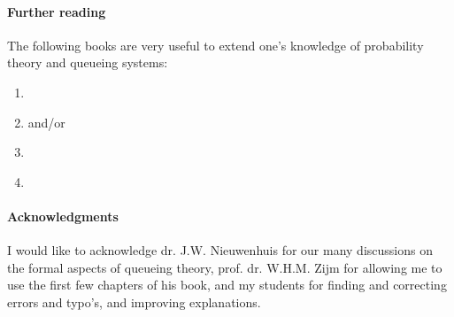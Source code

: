\paragraph{Further reading}

The following books are very useful to extend one's knowledge of probability theory and queueing systems:
\begin{enumerate}
\item \citet{capinski03:_probab_probl}
\item \citet{tijms94:_stoch_model_algor_approac} and/or \citet{tijms03:_first_cours_stoch_model}
\item \citet{el-taha98:_sampl_path_analy_queuein_system}
\item \citet{bolch06:_queuein_networ_markov_chain}
\end{enumerate}

\paragraph{Acknowledgments}

I would like to acknowledge dr.
J.W.
Nieuwenhuis for our many discussions on the formal aspects of queueing theory, prof.
dr.
W.H.M.
Zijm for allowing me to use the first few chapters of his book, and my students for finding and correcting errors and typo's, and improving explanations.



